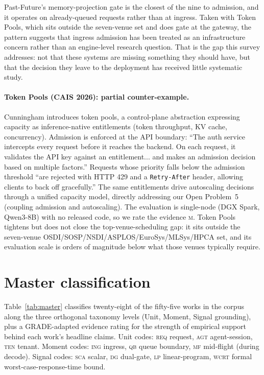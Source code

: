 \documentclass[10pt]{article} %
\theoremstyle{definition}
\begin{document}
Past-Future's memory-projection gate is the closest of the nine to
admission, and it operates on already-queued requests rather than at
ingress. Taken with Token Pools, which sits outside the seven-venue set
and does gate at the gateway, the pattern suggests that ingress
admission has been treated as an infrastructure concern rather than an
engine-level research question. That is the gap this survey addresses:
not that these systems are missing something they should have, but that
the decision they leave to the deployment has received little
systematic study.

\paragraph{Token Pools (CAIS 2026): partial counter-example.}
Cunningham \citep{cunningham2026tokenpools} introduces token pools, a
control-plane abstraction expressing capacity as inference-native
entitlements (token throughput, KV cache, concurrency). Admission is
enforced at the API boundary: ``The auth service intercepts every
request before it reaches the backend. On each request, it validates
the API key against an entitlement... and makes an admission decision
based on multiple factors.'' Requests whose priority falls below the
admission threshold ``are rejected with HTTP 429 and a
\texttt{Retry-After} header, allowing clients to back off gracefully.'' The same entitlements drive autoscaling
decisions through a unified capacity model, directly addressing our
Open Problem~5 (coupling admission and autoscaling). The evaluation
is single-node (DGX Spark, Qwen3-8B) with no released code, so we
rate the evidence \textsc{m}. Token Pools tightens but does not close
the top-venue-scheduling gap: it sits outside the seven-venue
OSDI/SOSP/NSDI/ASPLOS/EuroSys/MLSys/HPCA set, and its evaluation
scale is orders of magnitude below what those venues typically
require.

\section{Master classification}
\label{sec:master}

Table~\ref{tab:master} classifies twenty-eight of the fifty-five works
in the corpus along the three orthogonal
taxonomy levels (Unit, Moment, Signal grounding), plus a
GRADE-adapted evidence rating for the strength of empirical support
behind each work's headline claims. Unit codes: \textsc{req} request,
\textsc{agt} agent-session, \textsc{ten} tenant. Moment codes:
\textsc{ing} ingress, \textsc{qb} queue boundary, \textsc{mf}
mid-flight (during decode). Signal codes: \textsc{sca} scalar,
\textsc{dg} dual-gate, \textsc{lp} linear-program, \textsc{wcrt}
formal worst-case-response-time bound.
\end{document}
